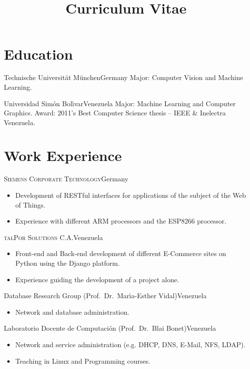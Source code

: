 \documentclass[10pt]{moderncv}
\title{Curriculum Vitae}
\begin{document}
\maketitle

\section{Education}

  {Technische Universit\"at M\"unchen}{Germany}{}{%
    Major: Computer Vision and Machine Learning.
  }

  {Universidad Sim\'on Bol\'{\i}var}{Venezuela}{}{%
    Major: Machine Learning and Computer Graphics.
    \newline
    Award: 2011's Best Computer Science thesis -- IEEE \& Inelectra Venezuela.
  }

\section{Work Experience}

{\textsc{Siemens Corporate Technology}}{Germany}{}{%
\begin{itemize}
  \item Development of RESTful interfaces for applications of the 
    subject of the Web of Things.
  \item Experience with different ARM processors and the ESP8266 processor.
\end{itemize}
}

{\textsc{talPor Solutions C.A.}}{Venezuela}{}{%
\begin{itemize}
  \item Front-end and Back-end development of different E-Commerce sites
    on Python using the Django platform.
  \item Experience guiding the development of a project alone.
\end{itemize}
}

{Database Research Group (Prof.\ Dr.\ Mar\'{\i}a-Esther Vidal)}{Venezuela}{}{%
\begin{itemize}
  \item Network and database administration.
\end{itemize}
}

{Laboratorio Docente de Computaci\'{o}n (Prof.\ Dr.\ Blai Bonet)}{Venezuela}{}{%
\begin{itemize}
  \item Network and service administration (e.g. DHCP, DNS, E-Mail, NFS, LDAP).
  \item Teaching in Linux and Programming courses.
\end{itemize}
}
\end{document}
